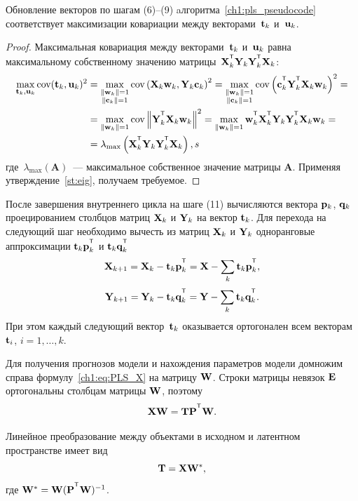 \begin{statement}
	Обновление векторов по шагам (6)--(9) aлгоритма~\ref{ch1:pls_pseudocode} соответствует максимизации ковариации между векторами~$\mathbf{t}_k$ и~$\mathbf{u}_k$.
\end{statement}
\begin{proof}
	Максимальная ковариация между векторами~$\mathbf{t}_k$ и~$\mathbf{u}_k$ равна максимальному собственному значению матрицы~$\bX_k^{\T} \bY_k \bY_k^{\T} \bX_k$:
	\begin{align*}
		\max_{\bt_k, \bu_k}  \text{cov} (\bt_k, \bu_k)^2 &= \max_{\substack{\|\bw_k\|=1 \\ \|\bc_k\| = 1}} \text{cov} \left( \bX_k \bw_k, \bY_k \bc_k \right)^2 = \max_{\substack{\|\bw_k\|=1 \\ \|\bc_k\| = 1}} \text{cov} \left(\bc_k^{\T}  \bY_k^{\T} \bX_k \bw_k \right)^2 = \\
		&= \max_{\|\bw_k\| = 1} \text{cov} \left\|\bY_k^{\T} \bX_k \bw_k \right\|^2 = \max_{\|\bw_k\| = 1} \bw_k^{\T} \bX_k^{\T} \bY_k \bY_k^{\T} \bX_k \bw_k = \\
		& = \lambda_{\max} \left( \bX_k^{\T} \bY_k \bY_k^{\T} \bX_k \right),
s	\end{align*}
	где~$\lambda_{\max} (\mathbf{A})$~--- максимальное собственное значение матрицы $\mathbf{A}$.
	Применяя утверждение~\ref{st:eig}, получаем требуемое.
\end{proof}

После завершения внутреннего цикла на шаге (11) вычисляются вектора $\mathbf{p}_k$, $\mathbf{q}_k$ проецированием столбцов матриц $\mathbf{X}_k$ и $\mathbf{Y}_k$ на вектор $\mathbf{t}_k$. 
Для перехода на следующий шаг необходимо вычесть из матриц $\mathbf{X}_k$ и $\mathbf{Y}_k$ одноранговые аппроксимации $\bt_k \bp_k^{\T}$ и $\bt_k \bq_k^{\T}$
\begin{equation*}
	\bX_{k + 1} = \bX_{k} - \bt_k \bp_k^{\T} = \bX - \sum_k \bt_k \bp_k^{\T},
\end{equation*}
\begin{equation*}
	\bY_{k + 1} = \bY_{k} - \bt_k \bq_k^{\T} = \bY - \sum_k \bt_k \bq_k^{\T}.
\end{equation*}
При этом каждый следующий вектор~$\mathbf{t}_k$ оказывается ортогонален всем векторам~$\mathbf{t}_i$, $i=1, \dots, k$.

Для получения прогнозов модели и нахождения параметров модели 
домножим справа формулу~\eqref{ch1:eq:PLS_X} на матрицу $\mathbf{W}$. Строки матрицы невязок $\mathbf{E}$ ортогональны столбцам матрицы $\mathbf{W}$, поэтому 
\[
\bX \bW = \bT \bP^{\T} \bW.
\] 

Линейное преобразование между объектами в исходном и латентном пространстве имеет вид
\begin{equation}
	\mathbf{T} = \mathbf{X} \mathbf{W}^*,
	\label{ch1:eq:W*}
\end{equation}
где $\bW^* = \bW (\bP^{\T} \bW)^{-1}$. 

